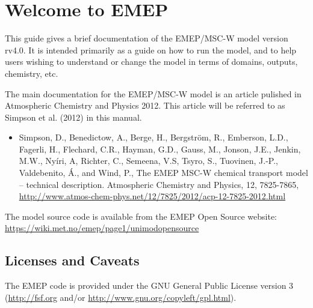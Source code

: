 
\chapter{Welcome to EMEP }

This guide gives a brief documentation of the EMEP/MSC-W model
version rv4.0. 
It is intended primarily as a guide on how to run the model, and
to help users wishing to understand or change 
the model in terms of domains, outputs, chemistry, etc.


The main documentation for the EMEP/MSC-W model is an article pulished 
in Atmospheric Chemistry and Physics 2012. %
This article will be referred to as Simpson et al. (2012) in
this manual. 


\begin{itemize}
\item
Simpson, D., Benedictow, A., Berge, H., Bergstr\"om, R., Emberson, L.D., Fagerli, H., Flechard, C.R., Hayman, G.D., Gauss, M., Jonson, J.E., Jenkin, M.W., Ny\'iri, A, Richter, C., Semeena, V.S, Tsyro, S., Tuovinen, J.-P., Valdebenito, \'A., and Wind, P.,
The EMEP MSC-W chemical transport model – technical description. 
Atmospheric Chemistry and Physics, 12, 7825-7865,
\url{http://www.atmos-chem-phys.net/12/7825/2012/acp-12-7825-2012.html}
\end{itemize}


The model source code is available from the  EMEP Open Source
  website:\\ \url{https://wiki.met.no/emep/page1/unimodopensource}

\newpage

\section{Licenses and Caveats}

The EMEP code is provided under the GNU General Public License version 3
(\url{http://fsf.org} and/or
\url{http://www.gnu.org/copyleft/gpl.html}).

